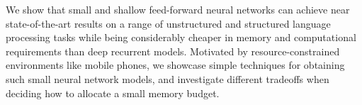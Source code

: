 We show that small and shallow feed-forward neural networks can achieve near state-of-the-art results on a range of unstructured and structured language processing tasks while being considerably cheaper in memory and computational requirements than deep recurrent models. Motivated by resource-constrained environments like mobile phones, we showcase simple techniques for obtaining such small neural network models, and investigate different tradeoffs when deciding how to allocate a small memory budget.
